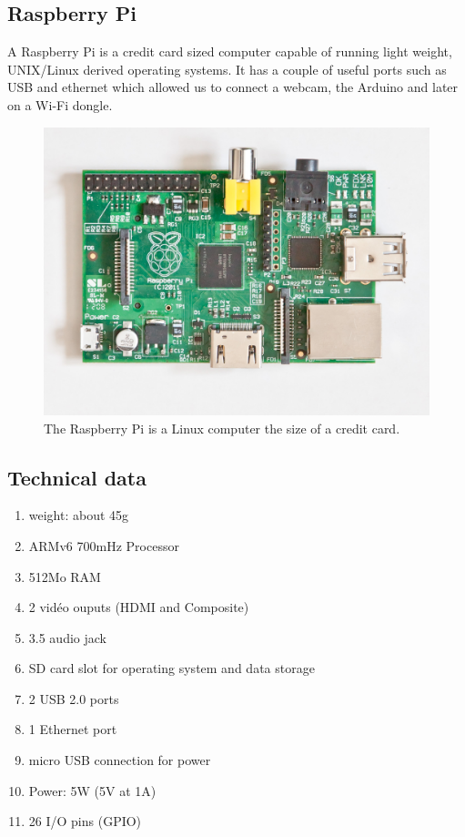 \documentclass[a4paper,11pt]{report}
\begin{document}
{\begin{enumerate}
\section{Raspberry Pi}
A Raspberry Pi is a credit card sized computer capable of running light
weight, UNIX/Linux derived operating systems. It has a couple of useful ports
such as USB and ethernet which allowed us to connect a webcam, the Arduino and
later on a Wi-Fi dongle.

\begin{figure}[h]
\includegraphics[width = 1.0\textwidth]{raspberrypi.jpg}
\caption[Raspberry Pi]{\label{RaspberryPi} The Raspberry Pi is a Linux
  computer the size of a credit card.}
\end{figure}

\subsection{Technical data \cite{RaspberryPiCaracteristiques}}
 
\begin{enumerate}
\item weight: about 45g
\item ARMv6 700mHz Processor
\item 512Mo RAM
\item 2 vidéo ouputs (HDMI and Composite)
\item 3.5 audio jack
\item SD card slot for operating system and data storage
\item 2 USB 2.0 ports
\item 1 Ethernet port
\item micro USB connection for power
\item Power: 5W (5V at 1A)
\item 26 I/O pins (GPIO)
\end{enumerate}


\end{enumerate}}
\end{document}
